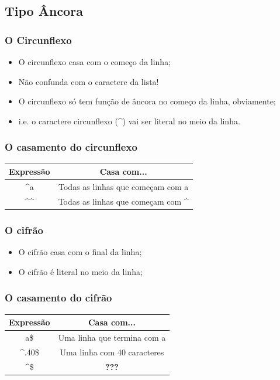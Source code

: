 \subsection{Tipo Âncora}


\begin{frame}
	\frametitle{O Circunflexo}

	\begin{itemize}
		\item O circunflexo casa com o começo da linha;
		\item Não confunda com o caractere da lista!
		\item O circunflexo só tem função de âncora no começo da linha, obviamente;
		\item i.e. o caractere circunflexo (\textasciicircum) vai ser literal no meio da linha.
	\end{itemize}
\end{frame}

\begin{frame}
	\frametitle{O casamento do circunflexo}
	\begin{center}
	\begin{tabular}{c|c}
		\textbf{Expressão} & \textbf{Casa com...} \\ \hline
		\textasciicircum a & Todas  as linhas que começam com a \\ \hline
		\textasciicircum \textasciicircum & Todas as linhas que começam com \textasciicircum \\ \hline
	\end{tabular}
	\end{center}
\end{frame}


\begin{frame}
	\frametitle{O cifrão}

	\begin{itemize}
		\item O cifrão casa com o final da linha;
		\item O cifrão é literal no meio da linha;
	\end{itemize}
\end{frame}

\begin{frame}
	\frametitle{O casamento do cifrão}

	\begin{center}
	\begin{tabular}{c|c}
		\textbf{Expressão} & \textbf{Casa com...} \\ \hline
		a\$		& Uma linha que termina com a \\ \hline
		\textasciicircum .{40}\$ & Uma linha com 40 caracteres \\ \hline
		\textasciicircum \$ & \textbf{???}		\\ \hline
	\end{tabular}
	\end{center}

\end{frame}

